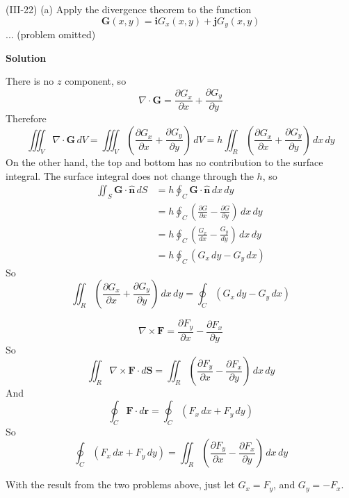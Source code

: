\documentclass{article}
\begin{document}
\begin{homeworkProblem}
	(III-22) (a) Apply the divergence theorem to the function
	\[
		\mathbf{G}(x,y)=\mathbf{i}G_x(x,y)+\mathbf{j}G_y(x,y)
	\]
	... (problem omitted)

	\textbf{Solution}

	\begin{enumerate}[label=(\alph*)]
		\begin{item}
			There is no $z$ component, so
			\[
				\nabla\cdot\mathbf{G}=\frac{\partial G_x}{\partial x}+\frac{\partial G_y}{\partial y}
			\]
			Therefore
			\[
				\iiint_V\nabla\cdot\mathbf{G}\,dV=\iiint_V\left(\frac{\partial G_x}{\partial x}+\frac{\partial G_y}{\partial y}\right)\,dV=h\iint_R\left(\frac{\partial G_x}{\partial x}+\frac{\partial G_y}{\partial y}\right)\,dx\,dy
			\]
			On the other hand, the top and bottom has no contribution to the surface integral. The surface integral does not change through the $h$, so
			\begin{align*}
				\iint_S\mathbf{G}\cdot\hat{\mathbf{n}}\,dS&=h\oint_C\mathbf{G}\cdot\hat{\mathbf{n}}\,dx\,dy \\
				&=h\oint_C\left(\frac{\partial G}{\partial x}-\frac{\partial G}{\partial y}\right)\,dx\,dy \\
				&=h\oint_C\left(\frac{G_x}{dx}-\frac{G_y}{dy}\right)\,dx\,dy \\
				&=h\oint_C\left(G_x\,dy-G_y\,dx\right)
			\end{align*}
			So
			\[
				\iint_R\left(\frac{\partial G_x}{\partial x}+\frac{\partial G_y}{\partial y}\right)\,dx\,dy=\oint_C\left(G_x\,dy-G_y\,dx\right)
			\]
		\end{item}
		\begin{item}
			\[
				\nabla\times\mathbf{F}=\frac{\partial F_y}{\partial x}-\frac{\partial F_x}{\partial y}
			\]
			So
			\[
				\iint_R\nabla\times\mathbf{F}\cdot d\mathbf{S}=\iint_R\left(\frac{\partial F_y}{\partial x}-\frac{\partial F_x}{\partial y}\right)\,dx\,dy
			\]
			And
			\[
				\oint_C\mathbf{F}\cdot d\mathbf{r}=\oint_C(F_x\,dx+F_y\,dy)
			\]
			So
			\[
				\oint_C(F_x\,dx+F_y\,dy)=\iint_R\left(\frac{\partial F_y}{\partial x}-\frac{\partial F_x}{\partial y}\right)\,dx\,dy
			\]
		\end{item}
		\begin{item}
			With the result from the two problems above, just let $G_x=F_y$, and $G_y=-F_x$.
		\end{item}
	\end{enumerate}
\end{homeworkProblem}
\end{document}
